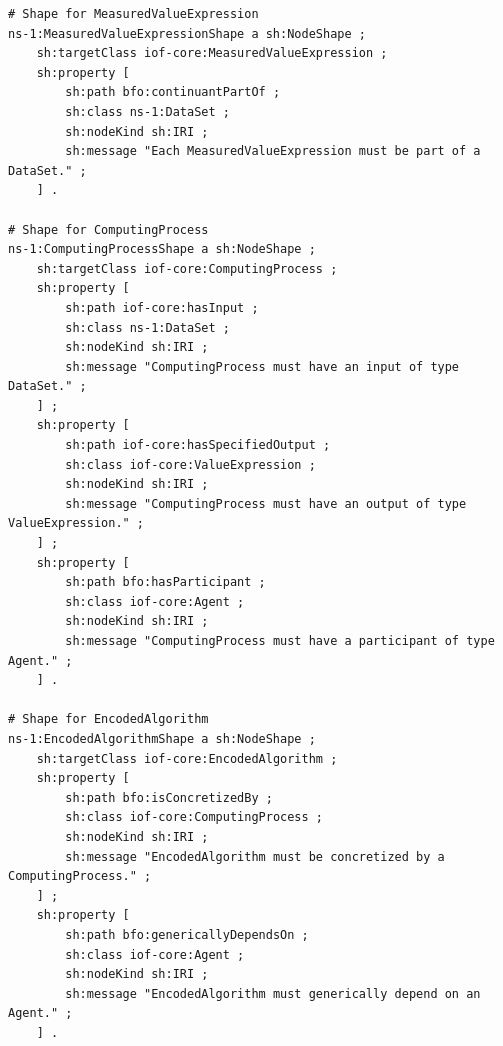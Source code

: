 \begin{verbatim}
# Shape for MeasuredValueExpression
ns-1:MeasuredValueExpressionShape a sh:NodeShape ;
    sh:targetClass iof-core:MeasuredValueExpression ;
    sh:property [
        sh:path bfo:continuantPartOf ;
        sh:class ns-1:DataSet ;
        sh:nodeKind sh:IRI ;
        sh:message "Each MeasuredValueExpression must be part of a DataSet." ;
    ] .

# Shape for ComputingProcess
ns-1:ComputingProcessShape a sh:NodeShape ;
    sh:targetClass iof-core:ComputingProcess ;
    sh:property [
        sh:path iof-core:hasInput ;
        sh:class ns-1:DataSet ;
        sh:nodeKind sh:IRI ;
        sh:message "ComputingProcess must have an input of type DataSet." ;
    ] ;
    sh:property [
        sh:path iof-core:hasSpecifiedOutput ;
        sh:class iof-core:ValueExpression ;
        sh:nodeKind sh:IRI ;
        sh:message "ComputingProcess must have an output of type ValueExpression." ;
    ] ;
    sh:property [
        sh:path bfo:hasParticipant ;
        sh:class iof-core:Agent ;
        sh:nodeKind sh:IRI ;
        sh:message "ComputingProcess must have a participant of type Agent." ;
    ] .

# Shape for EncodedAlgorithm
ns-1:EncodedAlgorithmShape a sh:NodeShape ;
    sh:targetClass iof-core:EncodedAlgorithm ;
    sh:property [
        sh:path bfo:isConcretizedBy ;
        sh:class iof-core:ComputingProcess ;
        sh:nodeKind sh:IRI ;
        sh:message "EncodedAlgorithm must be concretized by a ComputingProcess." ;
    ] ;
    sh:property [
        sh:path bfo:genericallyDependsOn ;
        sh:class iof-core:Agent ;
        sh:nodeKind sh:IRI ;
        sh:message "EncodedAlgorithm must generically depend on an Agent." ;
    ] .
\end{verbatim}

